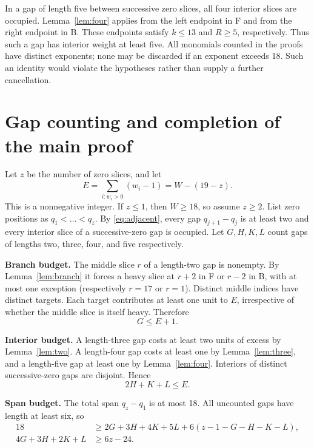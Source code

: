 \documentclass{article}
\begin{document}
In a gap of length five between successive zero slices, all four interior slices are occupied.
Lemma~\ref{lem:four} applies from the left endpoint in F and from the right endpoint in B. These
endpoints satisfy \(k \le 13\) and \(R \ge 5\), respectively. Thus such a gap has interior weight
at least five. All monomials counted in the proofs have distinct exponents; none may be discarded
if an exponent exceeds 18. Such an identity would violate the hypotheses rather than supply a
further cancellation.

\section{Gap counting and completion of the main proof}\label{sec:counting}

Let \(z\) be the number of zero slices, and let
\begin{equation}
  E = \sum_{i : w_i > 0} (w_i - 1) = W - (19 - z).
\end{equation}
This is a nonnegative integer. If \(z \le 1\), then \(W \ge 18\), so assume \(z \ge 2\). List
zero positions as \(q_1 < \ldots < q_z\). By \eqref{eq:adjacent}, every gap \(q_{j+1} - q_j\) is
at least two and every interior slice of a successive-zero gap is occupied. Let \(G, H, K, L\)
count gaps of lengths two, three, four, and five respectively.

\textbf{Branch budget.} The middle slice \(r\) of a length-two gap is nonempty. By
Lemma~\ref{lem:branch} it forces a heavy slice at \(r + 2\) in F or \(r - 2\) in B, with at most
one exception (respectively \(r = 17\) or \(r = 1\)). Distinct middle indices have distinct
targets. Each target contributes at least one unit to \(E\), irrespective of whether the middle
slice is itself heavy. Therefore
\begin{equation}\label{eq:branch-budget}
  G \le E + 1.
\end{equation}

\textbf{Interior budget.} A length-three gap costs at least two units of excess by
Lemma~\ref{lem:two}. A length-four gap costs at least one by Lemma~\ref{lem:three}, and a
length-five gap at least one by Lemma~\ref{lem:four}. Interiors of distinct successive-zero gaps
are disjoint. Hence
\begin{equation}\label{eq:interior-budget}
  2H + K + L \le E.
\end{equation}

\textbf{Span budget.} The total span \(q_z - q_1\) is at most 18. All uncounted gaps have length
at least six, so
\begin{equation}\label{eq:span-budget}
  \begin{aligned}
    18 &\ge 2G + 3H + 4K + 5L + 6(z - 1 - G - H - K - L), \\
    4G + 3H + 2K + L &\ge 6z - 24.
  \end{aligned}
\end{equation}
\end{document}
